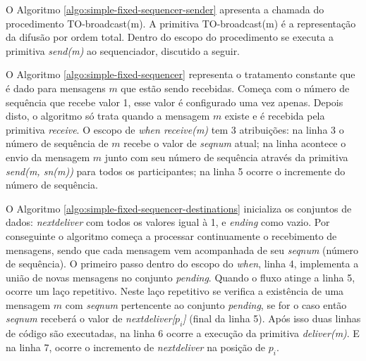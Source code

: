 

O Algoritmo \ref{algo:simple-fixed-sequencer-sender} apresenta a chamada do procedimento TO-broadcast(m). A primitiva TO-broadcast(m) é a representação da difusão por ordem total. Dentro do escopo do procedimento se executa a primitiva \textit{send(m)} ao sequenciador, discutido a seguir.



O Algoritmo \ref{algo:simple-fixed-sequencer} representa o tratamento constante que é dado para mensagens $m$ que estão sendo recebidas. Começa com o número de sequência que recebe valor 1, esse valor é configurado uma vez apenas. Depois disto, o algoritmo só trata quando a mensagem $m$ existe e é recebida pela primitiva \textit{receive}.
O escopo de \textit{when receive(m)} tem 3 atribuições: na linha 3 o número de sequência de $m$ recebe o valor de \textit{seqnum} atual; na linha acontece o envio da mensagem $m$ junto com seu número de sequência através da primitiva \textit{send(m, sn(m))} para todos os participantes; na linha 5 ocorre o incremente do número de sequência.

\pagebreak



O Algoritmo \ref{algo:simple-fixed-sequencer-destinations} inicializa os conjuntos de dados: \textit{nextdeliver} com todos os valores igual à 1, e \textit{ending} como vazio. Por conseguinte o algoritmo começa a processar continuamente o recebimento de mensagens, sendo que cada mensagem vem acompanhada de seu \textit{seqnum} (número de sequência). O primeiro passo dentro do escopo do \textit{when}, linha 4, implementa a união de novas mensagens no conjunto \textit{pending}. Quando o fluxo atinge a linha 5, ocorre um laço repetitivo. Neste laço repetitivo se verifica a existência de uma mensagem $m$ com \textit{seqnum} pertencente ao conjunto \textit{pending}, se for o caso então \textit{seqnum} receberá o valor de \textit{nextdeliver[$p_{i}$]} (final da linha 5). Após isso duas linhas de código são executadas, na linha 6 ocorre a execução da primitiva \textit{deliver(m)}. E na linha 7, ocorre o incremento de \textit{nextdeliver} na posição de $p_{i}$.



